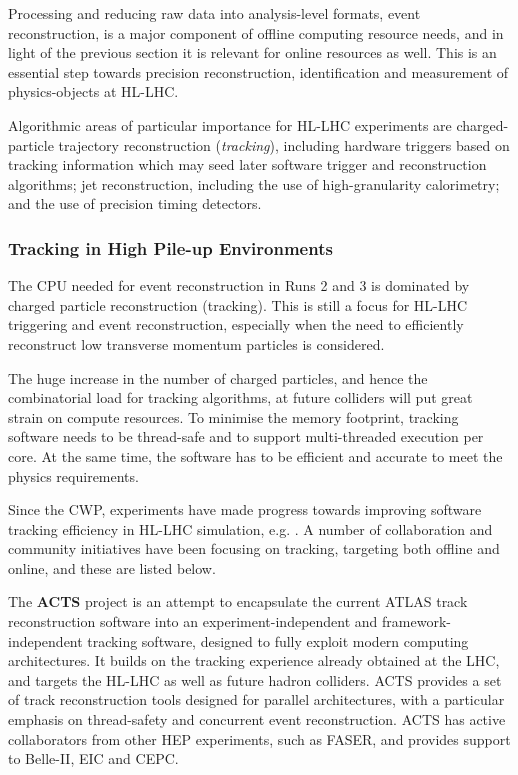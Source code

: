 Processing and reducing raw data into analysis-level formats, event
reconstruction, is a major component of offline computing resource
needs, and in light of the previous section it is relevant for online
resources as well. This is an essential step towards precision
reconstruction, identification and measurement of physics-objects at
HL-LHC.

Algorithmic areas of particular importance for HL-LHC experiments are
charged-particle trajectory reconstruction (\textit{tracking}), including
hardware triggers based on tracking information which may seed later
software trigger and reconstruction algorithms; jet reconstruction,
including the use of high-granularity calorimetry; and the use of
precision timing detectors.

\hypertarget{tracking-in-high-pile-up-environments}{%
\subsubsection{Tracking in High Pile-up
Environments}\label{tracking-in-high-pile-up-environments}}

The CPU needed for event reconstruction in Runs 2 and 3 is
dominated by charged particle reconstruction (tracking). This is still a
focus for HL-LHC triggering and event reconstruction, especially when
the need to efficiently reconstruct low transverse momentum
particles is considered.

The huge increase in the number of charged particles, and hence the
combinatorial load for tracking algorithms, at future colliders will put
great strain on compute resources. To minimise the memory footprint,
tracking software needs to be thread-safe and to support multi-threaded
execution per core. At the same time, the software has to be efficient
and accurate to meet the physics requirements.

Since the CWP, experiments have made progress towards improving software
tracking efficiency in HL-LHC simulation, e.g. \cite{ATL-PHYS-PUB-2019-041}. A
number of collaboration and community initiatives have been focusing on
tracking, targeting both offline and online, and these are listed below.

The \textbf{ACTS} project \cite{Ai:2019kze,Gumpert_2017} is an attempt to encapsulate
the current ATLAS track reconstruction software into an
experiment-independent and framework-independent tracking software,
designed to fully exploit modern computing architectures. It builds on
the tracking experience already obtained at the LHC, and targets the
HL-LHC as well as future hadron colliders. ACTS provides a set of track
reconstruction tools designed for parallel architectures, with a
particular emphasis on thread-safety and concurrent event
reconstruction. ACTS has active collaborators from other HEP
experiments, such as FASER, and provides support to Belle-II, EIC and CEPC.


